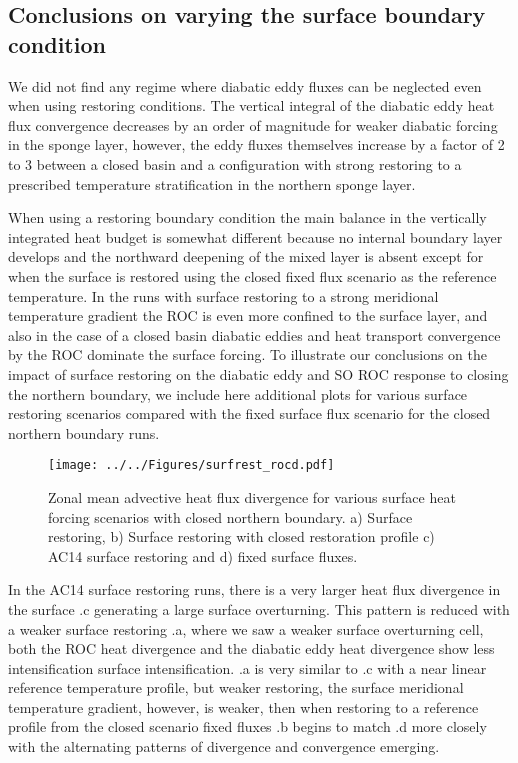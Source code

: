 \subsection{Conclusions on varying the surface boundary condition}


We did not find any regime where diabatic eddy fluxes can be neglected even when using restoring conditions. The vertical integral of the diabatic eddy heat flux convergence decreases by an order of magnitude for weaker diabatic forcing in the sponge layer, however, the eddy fluxes themselves increase by a factor of 2 to 3 between a closed basin and a configuration with strong restoring to a prescribed temperature stratification in the northern sponge layer. 

When using a restoring boundary condition the main balance in the vertically integrated heat budget is somewhat different because no internal boundary layer develops and the northward deepening of the mixed layer is absent except for when the surface is restored using the closed fixed flux scenario as the reference temperature. In the runs with surface restoring to a strong meridional temperature gradient the ROC is even more confined to the surface layer, and also in the case of a closed basin diabatic eddies and heat transport convergence by the ROC dominate the surface forcing. To illustrate our conclusions on the impact of surface restoring on the diabatic eddy and SO ROC response to closing the northern boundary, we include here additional plots for various surface restoring scenarios compared with the fixed surface flux scenario for the closed northern boundary runs. 
\begin{figure}[H]
\center
\noindent \texttt{[image: ../../Figures/surfrest\_rocd.pdf]} 
\caption{Zonal mean advective heat flux divergence for various surface heat forcing scenarios with closed northern boundary. a) Surface restoring, b) Surface restoring with closed restoration profile c) AC14 surface restoring and d) fixed surface fluxes.}
\label{fig:srrhd}
\end{figure}
In the AC14 surface restoring runs, there is a very larger heat flux divergence in the surface .c generating a large surface overturning. This pattern is reduced with a weaker surface restoring .a, where we saw a weaker surface overturning cell, both the ROC heat divergence and the diabatic eddy heat divergence show less intensification surface intensification. .a is very similar to .c with a near linear reference temperature profile, but weaker restoring, the surface meridional temperature gradient, however, is weaker, then when restoring to a reference profile from the closed scenario fixed fluxes .b begins to match .d more closely with the alternating patterns of divergence and convergence emerging.
